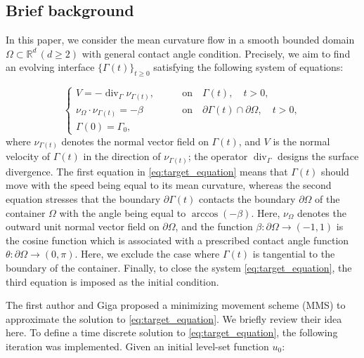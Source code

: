 \documentclass[11pt]{article}
\numberwithin{equation}{section}
\newcommand{\R}{\mathbb{R}}
\def\ge{\geqslant}
\begin{document}
\subsection{Brief background}

In this paper, we consider the mean curvature flow in a smooth bounded domain $\Omega\subset\R^d\,(d\ge 2)$ with general contact angle condition. Precisely, we aim to find an evolving interface $\{\Gamma(t)\}_{t\ge 0}$ satisfying the following system of equations:

\begin{equation}
\label{eq:target_equation}
    \begin{cases}
    V = - \operatorname{div}_{\Gamma}\nu_{\Gamma(t)},&\qquad \mbox{on}\quad \Gamma(t),\quad t > 0,\\
    \nu_\Omega\cdot\nu_{\Gamma(t)} = -\beta & \qquad\mbox{on}\quad \partial\Gamma(t)\cap \partial\Omega,\quad t > 0,\\
    \Gamma(0) = \Gamma_0,
    \end{cases}
\end{equation}
where $\nu_{\Gamma(t)}$ denotes the normal vector field on $\Gamma(t)$, and $V$ is the normal velocity of $\Gamma(t)$ in the direction of $\nu_{\Gamma(t)}$; the operator $\operatorname{div}_\Gamma$ designs the surface divergence. The first equation in \eqref{eq:target_equation} means that $\Gamma(t)$ should move with the speed being equal to its mean curvature, whereas the second equation stresses that the boundary $\partial\Gamma(t)$ contacts the boundary $\partial\Omega$ of the container $\Omega$ with the angle being equal to $\arccos{(-\beta)}$. Here, $\nu_\Omega$ denotes the outward unit normal vector field on $\partial\Omega$, and the function $\beta:\partial\Omega\to(-1,1)$ is the cosine function which is associated with a prescribed contact angle function $\theta:\partial\Omega\to(0,\pi)$. Here, we exclude the case where $\Gamma(t)$ is tangential to the boundary of the container. Finally, to close the system \eqref{eq:target_equation}, the third equation is imposed as the initial condition.

The first author and Giga \cite{EG24} proposed a minimizing movement scheme (MMS) to approximate the solution to \eqref{eq:target_equation}. We briefly review their idea here. To define a time discrete solution to \eqref{eq:target_equation}, the following iteration was implemented. Given an initial level-set function $u_0$:
\end{document}
